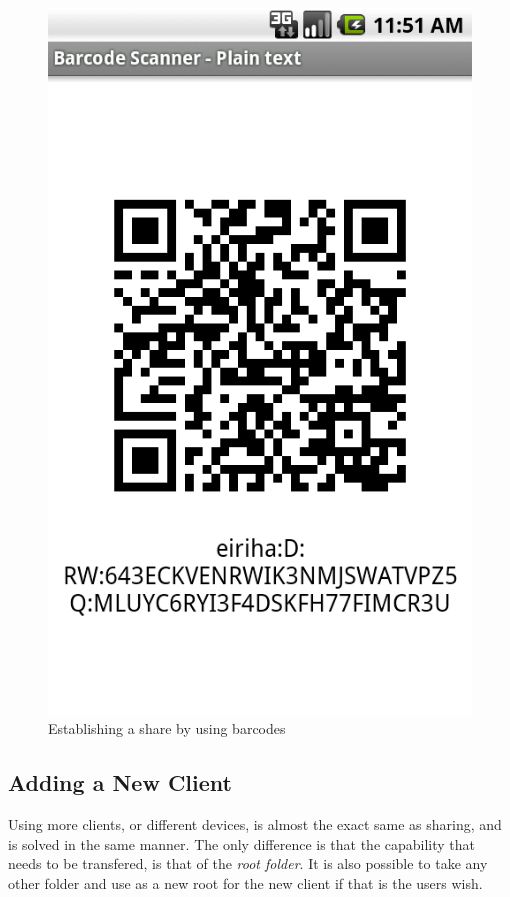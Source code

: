 \documentclass[pdftex,english,10pt,b5paper,twoside]{book}
\begin{document}
\begin{figure}[h!]
    \centering
    \includegraphics[scale=0.4]{client-barcode.png}
    \caption{Establishing a share by using barcodes}
    \label{fig:csvandroid:barcode}
\end{figure}

\subsection{Adding a New Client}

Using more clients, or different devices, is almost the exact same as sharing,
and is solved in the same manner. The only difference is that the capability
that needs to be transfered, is that of the \emph{root folder}. It is also
possible to take any other folder and use as a new root for the new client if
that is the users wish.
\end{document}
